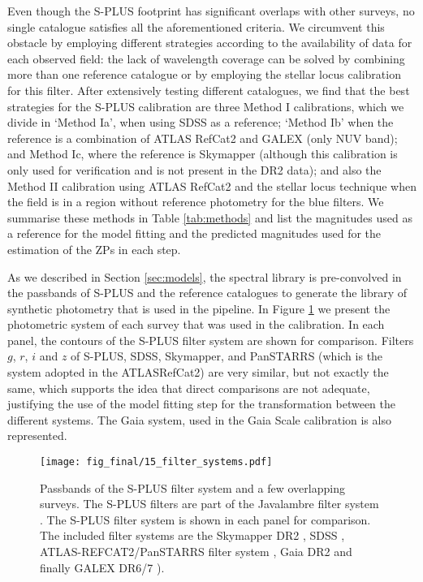 \documentclass[fleqn,usenatbib]{mnras}
\begin{document}
Even though the S-PLUS footprint has significant overlaps with other surveys, no single catalogue satisfies all the aforementioned criteria. We circumvent this obstacle by employing different strategies according to the availability of data for each observed field: the lack of wavelength coverage can be solved by combining more than one reference catalogue or by employing the stellar locus calibration for this filter. After extensively testing different catalogues, we find that the best strategies for the S-PLUS calibration are three Method I calibrations, which we divide in  `Method Ia', when using SDSS as a reference; `Method Ib' when the reference is a combination of ATLAS RefCat2 and GALEX (only NUV band); and Method Ic, where the reference is Skymapper (although this calibration is only used for verification and is not present in the DR2 data); and also the Method II calibration using ATLAS RefCat2 and the stellar locus technique when the field is in a region without reference photometry for the blue filters. We summarise these methods in Table \ref{tab:methods} and list the magnitudes used as a reference for the model fitting and the predicted magnitudes used for the estimation of the ZPs in each step.

As we described in Section \ref{sec:models}, the  spectral library is pre-convolved in the passbands of S-PLUS and the reference catalogues to generate the library of synthetic photometry that is used in the pipeline. In Figure \ref{fig:filter_system} we present the photometric system of each survey that was used in the calibration. In each panel, the contours of the S-PLUS filter system are shown for comparison. Filters $g$, $r$, $i$ and $z$ of S-PLUS, SDSS, Skymapper, and PanSTARRS (which is the system adopted in the ATLASRefCat2) are very similar, but not exactly the same, which supports the idea that direct comparisons are not adequate, justifying the use of the model fitting step for the transformation between the different systems. The Gaia system, used in the Gaia Scale calibration is also represented.

\begin{figure}
\begin{center}
\texttt{[image: fig\_final/15\_filter\_systems.pdf]}
\caption{\label{fig:filter_system}Passbands of the S-PLUS filter system and a few overlapping surveys. The S-PLUS filters are part of the Javalambre filter system \citep{MarinFranch+2012}. The S-PLUS filter system is shown in each panel for comparison. The included filter systems are the Skymapper DR2 \citep{Bessell+2011}, SDSS \citep{Doi+2010}, ATLAS-REFCAT2/PanSTARRS filter system \citep{Chambers+2016, Tonry+2018}, Gaia DR2 \citep{Evans+2018} and finally GALEX DR6/7 \citep{Morrissey+2005}).}
\end{center}
\end{figure}
\end{document}

